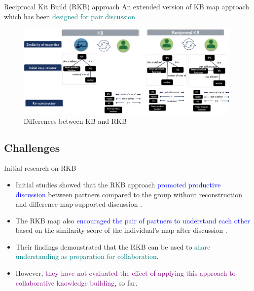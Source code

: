 \begin{frame}{Reciprocal Kit Build (RKB) approach}
    An extended version of KB map approach which has been \textcolor{teal}{designed for pair discussion}
    \begin{figure}[tb]
        \begin{center}
            \includegraphics[width=110mm]{images/kb_rkb.pdf}
        \end{center}
        \caption{Differences between KB and RKB}
        \label{intro::kb_rkb}
    \end{figure}
    
\end{frame}


\subsection{Challenges}

\begin{frame}{Initial research on RKB}
    \begin{itemize}
        \item <1-3> Initial studies showed that the RKB approach \textcolor{blue}{promoted productive
        discussion} between partners compared to the group without reconstruction
        and difference map-supported discussion
        \cite{Wunnasri2018ReciprocalUnderstanding}. 
        \item <2-3>The RKB map also \textcolor{blue}{encouraged the pair of partners to understand each other} based on the similarity
        score of the individual's map after discussion
        \cite{Wunnasri2018ReciprocalCollaboration}. 
        \item <3-> Their findings demonstrated that the RKB can be used to \textcolor{teal}{share understanding as preparation for
        collaboration}. 
        \item <4->However, \textcolor{purple}{they have not evaluated the effect of applying
        this approach to collaborative knowledge building}, so far. 
        
    \end{itemize}
\end{frame}

